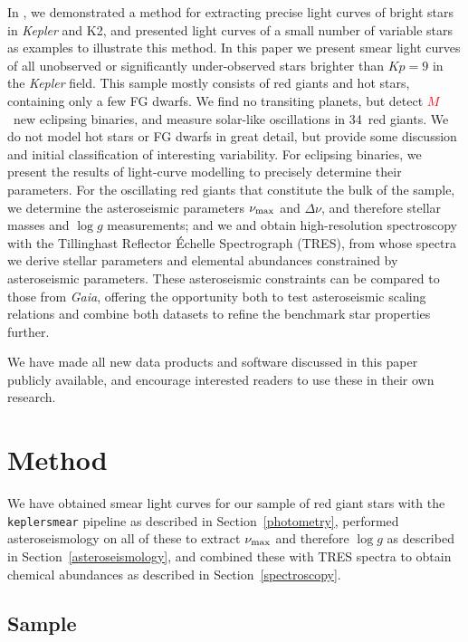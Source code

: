 \documentclass[a4paper,fleqn,usenatbib]{mnras}
\newcommand{\numax}{\mbox{$\nu_{\rm max}$}\xspace}
\newcommand{\Dnu}{\mbox{$\Delta \nu$}\xspace}
\newcommand{\logg}{\mbox{$\log g$}\xspace}
\newcommand{\kepler}{\emph{Kepler}\xspace}
\newcommand{\gaia}{\emph{Gaia}\xspace}
\begin{document}
In \citet{smear}, we demonstrated a method for extracting precise light curves of bright stars in \kepler and K2, and presented light curves of a small number of variable stars as examples to illustrate this method. In this paper we present smear light curves of all unobserved or significantly under-observed stars brighter than $Kp=9$ in the \kepler field. This sample mostly consists of red giants and hot stars, containing only a few FG dwarfs. We find no transiting planets, but detect \textcolor{red}{$M$}~new eclipsing binaries, and measure solar-like oscillations in 34~red giants. We do not model hot stars or FG dwarfs in great detail, but provide some discussion and initial classification of interesting variability. For eclipsing binaries, we present the results of light-curve modelling to precisely determine their parameters. For the oscillating red giants that constitute the bulk of the sample, we determine the asteroseismic parameters \numax and \Dnu, and therefore stellar masses and \logg measurements; and we and obtain high-resolution spectroscopy with the Tillinghast Reflector \'{E}chelle Spectrograph (TRES), from whose spectra we derive stellar parameters and elemental abundances constrained by asteroseismic parameters. These asteroseismic constraints can be compared to those from \gaia, offering the opportunity both to test asteroseismic scaling relations and combine both datasets to refine the benchmark star properties further.

We have made all new data products and software discussed in this paper publicly available, and encourage interested readers to use these in their own research.   

\section{Method}
\label{method}

We have obtained smear light curves for our sample of red giant stars with the \texttt{keplersmear} pipeline as described in Section~\ref{photometry}, performed asteroseismology on all of these to extract \numax and therefore \logg as described in Section~\ref{asteroseismology}, and combined these with TRES spectra to obtain chemical abundances as described in Section~\ref{spectroscopy}. 

\subsection{Sample}
\label{sample}
\end{document}
